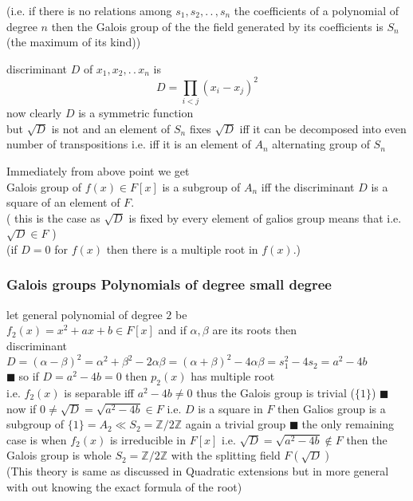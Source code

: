 \documentclass[11pt]{extarticle}
\newcommand{\Z}{\mathbb{Z}}
\newcommand{\ck}{.\,.\,}
\newcommand{\snote}[1]{{\footnotesize(#1)}}
\newcommand{\tbx}[2][]{
\begin{tcolorbox}[enhanced,breakable,size=small,colback=black!2!white,title={#1},arc is angular, arc=1.5mm,drop fuzzy shadow]
	#2
\end{tcolorbox}
}
\newcommand{\y}{$\blacksquare\;$}
\begin{document}
\begin{multicols}{2}
{ \snote{i.e. if there is no relations among $s_1,s_2,\ck,s_n $ the coefficients of a polynomial of degree $ n $ then the Galois group of the the field generated by its coefficients is $ S_n $ (the maximum of its kind)}}
\tbx[Discriminant]{ discriminant $ D $ of $ x_1,x_2,\ck x_n $ is \[D=\prod\limits_{i<j}(x_i-x_j)^2\]
 now clearly $ D $ is a symmetric function\\
 but $ \sqrt{D} $ is not and an element of $ S_n $ fixes $ \sqrt{D} $ iff it can be decomposed into even number of transpositions i.e. iff it is an element of $ A_n $ alternating group of $ S_n $  }
 \tbx{ Immediately from above point we get \\
 Galois group of $ f(x)\in F[x] $ is a subgroup of $A_n $ iff the discriminant $ D $ is a square of an element of $ F. $ \\
 \snote{ this is the case as $ \sqrt{D} $ is fixed by every element of galios group means that i.e. $ \sqrt{D}\in F $ }  \\ \snote{if $ D=0 $ for $ f(x) $ then there is a multiple root in $ f(x) .$}}
 
 \subsubsection{Galois groups Polynomials of degree small degree}
 \tbx[Polynomials of degree $ 2 $ ]{ let general polynomial of degree $ 2 $ be \\
 $f_2(x)= x^2+ax+b \in F[x]$ and if $ \alpha,\beta $ are its roots then \\
 discriminant $ D=(\alpha-\beta)^2=\alpha^2+\beta^2-2\alpha\beta=(\alpha+\beta)^2-4\alpha\beta=s_1^2 -4s_2= a^2-4b$ \\
 \y so if $ D=a^2-4b=0 $ then $ p_2(x) $ has multiple root\\
 i.e. $ f_2(x) $ is separable iff $ a^2-4b\neq 0 $ thus the Galois group is trivial \snote{$\{1\}$}
 \y now if $ 0\neq \sqrt{D}=\sqrt{a^2-4b}\in F $ i.e. $ D $ is a square in $ F $ then Galios group is a subgroup of $\{1\}=A_2\ll S_2=\Z/2\Z   $ again a  trivial group
 \y the only remaining case is when $ f_2(x) $ is irreducible in $ F[x] $ i.e. $ \sqrt{D}=
 \sqrt{a^2-4b} \notin F$ then the Galois group is whole $ S_2=\Z/2\Z $ with the splitting field $ F(\sqrt{D}) $ \\
 \snote{This theory is same as discussed in Quadratic extensions but in more general with out knowing the exact formula of the root}}


\end{multicols}
\end{document}
